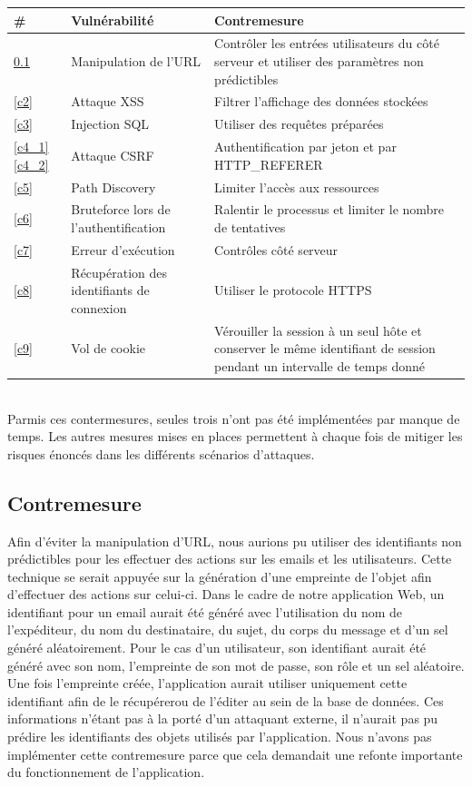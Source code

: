 \documentclass[12pt]{article}
\begin{document}
\begin{tabular}{| p{0.7cm} | p{7.5cm} | p{7.5cm} |}
  \hline			
  \textbf{\# } &\textbf{ Vulnérabilité }& \textbf{Contremesure} \\
  \hline  
  \ref{c1} & Manipulation de l'URL & Contrôler les entrées utilisateurs du côté serveur et utiliser des paramètres non prédictibles \\
  \hline
  \ref{c2} & Attaque XSS & Filtrer l'affichage des données stockées \\
  \hline
  \ref{c3} & Injection SQL & Utiliser des requêtes préparées \\
  \hline
  \ref{c4_1} \ref{c4_2} & Attaque CSRF & Authentification par jeton et par HTTP\_REFERER \\
  \hline
  \ref{c5} & Path Discovery & Limiter l'accès aux ressources \\
  \hline
  \ref{c6} & Bruteforce lors de l'authentification & Ralentir le processus et limiter le nombre de tentatives \\
  \hline
  \ref{c7} & Erreur d'exécution & Contrôles côté serveur \\
  \hline
  \ref{c8} & Récupération des identifiants de connexion & Utiliser le protocole HTTPS \\
  \hline
  \ref{c9} & Vol de cookie & Vérouiller la session à un seul hôte et conserver le même identifiant de session pendant un intervalle de temps donné \\
  \hline
\end{tabular}\\


Parmis ces contermesures, seules trois n'ont pas été implémentées par manque de temps. Les autres mesures mises en places permettent à chaque fois de mitiger les risques énoncés dans les différents scénarios d'attaques.

\newpage
\subsection{Contremesure}\label{c1}

Afin d'éviter la manipulation d'URL, nous aurions pu utiliser des identifiants non prédictibles pour les effectuer des actions sur les emails et les utilisateurs. Cette technique se serait appuyée sur la génération d'une empreinte de l'objet afin d'effectuer des actions sur celui-ci. Dans le cadre de notre application Web, un identifiant pour un email aurait été généré avec l'utilisation du nom de l'expéditeur, du nom du destinataire, du sujet, du corps du message et d'un sel généré aléatoirement. Pour le cas d'un utilisateur, son identifiant aurait été généré avec son nom, l'empreinte de son mot de passe, son rôle et un sel aléatoire.
Une fois l'empreinte créée, l'application aurait utiliser uniquement cette identifiant afin de le récupérerou de l'éditer au sein de la base de données.
Ces informations n'étant pas à la porté d'un attaquant externe, il n'aurait pas pu prédire les identifiants des objets utilisés par l'application.
Nous n'avons pas implémenter cette contremesure parce que cela demandait une refonte importante du fonctionnement de l'application. 
\end{document}
